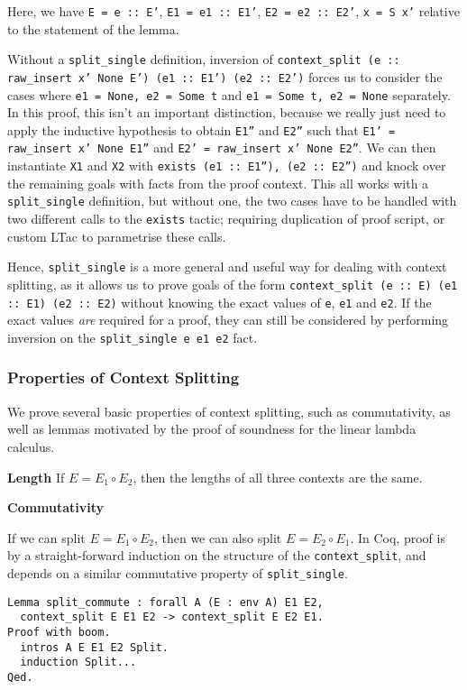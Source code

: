 \documentclass[]{unswthesis}
\let\c\texttt
\let\i\textit
\begin{document}
Here, we have \c{E = e :: E'}, \c{E1 = e1 :: E1'}, \c{E2 = e2 :: E2'}, \c{x = S x'} relative to the statement of the lemma.

Without a \c{split_single} definition, inversion of \c{context_split (e :: raw_insert x' None E') (e1 :: E1') (e2 :: E2')} forces us to consider the cases where \c{e1 = None, e2 = Some t} and \c{e1 = Some t, e2 = None} separately. In this proof, this isn't an important distinction, because we really just need to apply the inductive hypothesis to obtain \c{E1''} and \c{E2''} such that \c{E1' = raw_insert x' None E1''} and \c{E2' = raw_insert x' None E2''}. We can then instantiate \c{X1} and \c{X2} with \c{exists (e1 :: E1''), (e2 :: E2'')} and knock over the remaining goals with facts from the proof context. This all works with a \c{split_single} definition, but without one, the two cases have to be handled with two different calls to the \c{exists} tactic; requiring duplication of proof script, or custom LTac to parametrise these calls.

Hence, \c{split_single} is a more general and useful way for dealing with context splitting, as it allows us to prove goals of the form \c{context_split (e :: E) (e1 :: E1) (e2 :: E2)} without knowing the exact values of \c{e}, \c{e1} and \c{e2}. If the exact values \i{are} required for a proof, they can still be considered by performing inversion on the \c{split_single e e1 e2} fact.

\subsubsection{Properties of Context Splitting}

We prove several basic properties of context splitting, such as commutativity, as well as lemmas motivated by the proof of soundness for the linear lambda calculus. 

\textbf{Length} If $E = E_1 \circ E_2$, then the lengths of all three contexts are the same.

\textbf{Commutativity}

If we can split $E = E_1 \circ E_2$, then we can also split $E = E_2 \circ E_1$. In Coq, proof is by a straight-forward induction on the structure of the \c{context_split}, and depends on a similar commutative property of \c{split_single}.

\begin{verbatim}
Lemma split_commute : forall A (E : env A) E1 E2,
  context_split E E1 E2 -> context_split E E2 E1.
Proof with boom.
  intros A E E1 E2 Split.
  induction Split...
Qed.
\end{verbatim}
\end{document}
